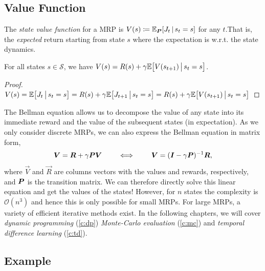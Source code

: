 		\subsection{Value Function}
			\begin{definition}
				The \emph{state value function} for a \ac{MRP} is \( V(s) \coloneqq \mathbb{E}_{\bm{P}}[J_t \,\vert\, s_t = s] \) for any \(t\).That is, the \emph{expected} return starting from state \(s\) where the expectation is w.r.t. the state dynamics.
			\end{definition}
			\begin{theorem}
				For all states \(s \in \mathcal{S}\), we have \( V(s) = R(s) + \gamma \mathbb{E}\bigl[ V(s_{t + 1}) \,\big\vert\, s_t = s \bigr] \).
			\end{theorem}
			\begin{proof}  %
				\(
					V(s)
						= \mathbb{E}\bigl[ J_t \,\big\vert\, s_t = s \bigr]
						= R(s) + \gamma \mathbb{E}\bigl[ J_{t + 1} \,\big\vert\, s_t = s \bigr]
						= R(s) + \gamma \mathbb{E}\bigl[ V(s_{t + 1}) \,\big\vert\, s_t = s \bigr]
				\)
			\end{proof}
			The Bellman equation allows us to decompose the value of any state into its immediate reward and the value of the subsequent states (in expectation). As we only consider discrete \acp{MRP}, we can also express the Bellman equation in matrix form,
			\begin{equation}
				\bm{V} = \bm{R} + \gamma \bm{P} \bm{V}
				\qquad\iff\qquad
				\bm{V} = (\bm{I} - \gamma \bm{P})^{-1} \bm{R},
				\label{eq:closedFormBellman}
			\end{equation}
			where \(\vec{V}\) and \(\vec{R}\) are columns vectors with the values and rewards, respectively, and \(\bm{P}\) is the transition matrix. We can therefore directly solve this linear equation and get the values of the states! However, for \(n\) states the complexity is \(\mathcal{O}(n^3)\) and hence this is only possible for small \acp{MRP}. For large \acp{MRP}, a variety of efficient iterative methods exist. In the following chapters, we will cover \emph{dynamic programming} (\autoref{c:dp}) \emph{Monte-Carlo evaluation} (\autoref{c:mc}) and \emph{temporal difference learning} (\autoref{c:td}).

		\subsection{Example} %

